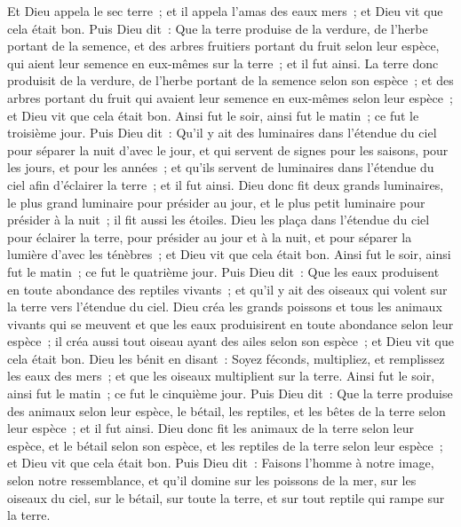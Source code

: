 \begin{multicols}{2}
Et Dieu appela le sec terre~; et il appela l'amas des eaux mers~; et Dieu vit que cela était bon.
Puis Dieu dit~: Que la terre produise de la verdure, de l'herbe portant de la semence, et des arbres fruitiers portant du fruit selon leur espèce, qui aient leur semence en eux-mêmes sur la terre~; et il fut ainsi.
La terre donc produisit de la verdure, de l'herbe portant de la semence selon son espèce~; et des arbres portant du fruit qui avaient leur semence en eux-mêmes selon leur espèce~; et Dieu vit que cela était bon.
Ainsi fut le soir, ainsi fut le matin~; ce fut le troisième jour.
Puis Dieu dit~: Qu'il y ait des luminaires dans l'étendue du ciel pour séparer la nuit d'avec le jour, et qui servent de signes pour les saisons, pour les jours, et pour les années~;
et qu'ils servent de luminaires dans l'étendue du ciel afin d'éclairer la terre~; et il fut ainsi.
Dieu donc fit deux grands luminaires, le plus grand luminaire pour présider au jour, et le plus petit luminaire pour présider à la nuit~; il fit aussi les étoiles.
Dieu les plaça dans l'étendue du ciel pour éclairer la terre,
pour présider au jour et à la nuit, et pour séparer la lumière d'avec les ténèbres~; et Dieu vit que cela était bon.
Ainsi fut le soir, ainsi fut le matin~; ce fut le quatrième jour.
Puis Dieu dit~: Que les eaux produisent en toute abondance des reptiles vivants~; et qu'il y ait des oiseaux qui volent sur la terre vers l'étendue du ciel.
Dieu créa les grands poissons et tous les animaux vivants qui se meuvent et que les eaux produisirent en toute abondance selon leur espèce~; il créa aussi tout oiseau ayant des ailes selon son espèce~; et Dieu vit que cela était bon.
Dieu les bénit en disant~: Soyez féconds, multipliez, et remplissez les eaux des mers~; et que les oiseaux multiplient sur la terre.
Ainsi fut le soir, ainsi fut le matin~; ce fut le cinquième jour.
Puis Dieu dit~: Que la terre produise des animaux selon leur espèce, le bétail, les reptiles, et les bêtes de la terre selon leur espèce~; et il fut ainsi.
Dieu donc fit les animaux de la terre selon leur espèce, et le bétail selon son espèce, et les reptiles de la terre selon leur espèce~; et Dieu vit que cela était bon.
Puis Dieu dit~: Faisons l'homme à notre image, selon notre ressemblance, et qu'il domine sur les poissons de la mer, sur les oiseaux du ciel, sur le bétail, sur toute la terre, et sur tout reptile qui rampe sur la terre.

\end{multicols}
